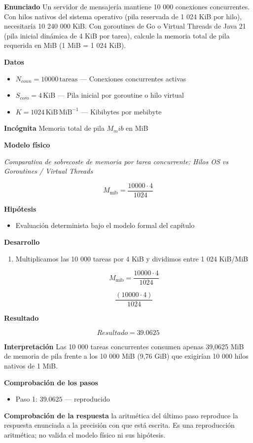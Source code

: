 \documentclass{book}
\begin{document}
\begin{tcolorbox}[title={Problema resuelto}, studiumworked, breakable]

\noindent\textbf{Enunciado}
Un servidor de mensajería mantiene 10 000 conexiones concurrentes. Con hilos nativos del sistema operativo (pila reservada de 1 024 KiB por hilo), necesitaría 10 240 000 KiB. Con goroutines de Go o Virtual Threads de Java 21 (pila inicial dinámica de 4 KiB por tarea), calcule la memoria total de pila requerida en MiB (1 MiB = 1 024 KiB).

\noindent\textbf{Datos}
\begin{itemize}
\item $N_{conn} = 10000\,\mathrm{tareas}$ — Conexiones concurrentes activas
\item $S_{coro} = 4\,\mathrm{KiB}$ — Pila inicial por goroutine o hilo virtual
\item $K = 1024\,\mathrm{KiB}\,\mathrm{MiB}^{-1}$ — Kibibytes por mebibyte
\end{itemize}

\noindent\textbf{Incógnita}
Memoria total de pila \(M_mib\) en MiB

\noindent\textbf{Modelo físico}

\noindent\textit{Comparativa de sobrecoste de memoria por tarea concurrente: Hilos OS vs Goroutines / Virtual Threads}

\[
M_{\text{mib}} = \frac{10000 \cdot 4}{1024}
\]

\noindent\textbf{Hipótesis}
\begin{itemize}
\item Evaluación determinista bajo el modelo formal del capítulo
\end{itemize}

\noindent\textbf{Desarrollo}
\begin{enumerate}
\item
Multiplicamos las 10 000 tareas por 4 KiB y dividimos entre 1 024 KiB/MiB

\[
M_{\text{mib}} = \frac{10000 \cdot 4}{1024}
\]

\[
\frac{\left(10000\cdot 4\right)}{1024}
\]
\end{enumerate}

\noindent\textbf{Resultado}

\[
Resultado = 39.0625
\]

\noindent\textbf{Interpretación}
Las 10 000 tareas concurrentes consumen apenas 39,0625 MiB de memoria de pila frente a los 10 000 MiB (9,76 GiB) que exigirían 10 000 hilos nativos de 1 MiB.

\noindent\textbf{Comprobación de los pasos}
\begin{itemize}
\item Paso 1: $39.0625$ — reproducido
\end{itemize}

\noindent\textbf{Comprobación de la respuesta} la aritmética del último paso reproduce la respuesta enunciada a la precisión con que está escrita. Es una reproducción aritmética; no valida el modelo físico ni sus hipótesis.
\end{tcolorbox}
\end{document}
